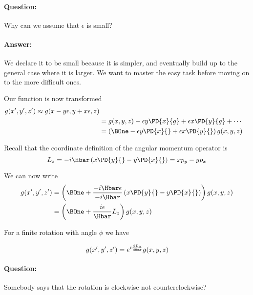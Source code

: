 \paragraph{Question:} Why can we assume that \(\epsilon\) is small?

\paragraph{Answer:} We declare it to be small because it is simpler, and eventually build up to the general case where it is larger.  We want to master the easy task before moving on to the more difficult ones.

Our function is now transformed
\begin{equation}\label{eqn:lecture12rotationsAndAngularMomentum:280}
\begin{aligned}
g(x', y', z') \approx g( x - y \epsilon, y + x \epsilon, z) \\
&=
g( x , y , z) - \epsilon y \PD{x}{g} + \epsilon x \PD{y}{g} + \cdots \\
&=
\left( \BOne
- \epsilon y \PD{x}{}
+ \epsilon x \PD{y}{}
\right)
g( x, y ,z )
\end{aligned}
\end{equation}

Recall that the coordinate definition of the angular momentum operator is
\begin{equation}\label{eqn:PHY356FDec7:120}
L_z = -i \Hbar \left( x \PD{y}{} - y \PD{x}{} \right) = x p_y - y p_x
\end{equation}

We can now write
\begin{equation}\label{eqn:lecture12rotationsAndAngularMomentum:300}
\begin{aligned}
g(x', y', z')
&=
\left( \BOne
+
\frac{-i \Hbar \epsilon}{-i\Hbar} \left(
x \PD{y}{}
- y \PD{x}{}
\right)
\right)
g( x, y ,z ) \\
&=
\left( \BOne +
\frac{i \epsilon}{\Hbar} L_z
\right)
g( x, y ,z )
\end{aligned}
\end{equation}

For a finite rotation with angle \(\phi\) we have

\begin{equation}\label{eqn:PHY356FDec7:130}
g(x', y', z')
=
e^{i \frac{\phi L_z}{\Hbar}}
g( x, y ,z )
\end{equation}

\paragraph{Question:} Somebody says that the rotation is clockwise not counterclockwise?

